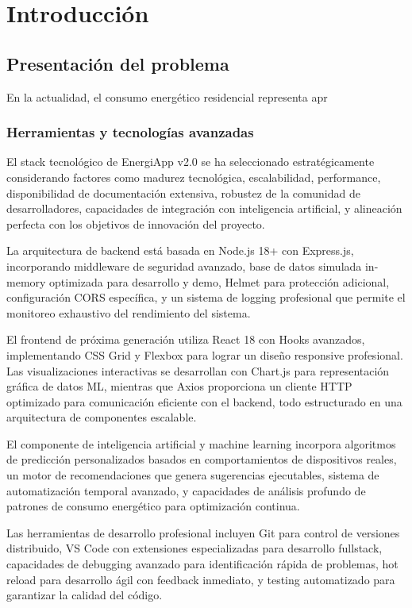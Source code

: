 \chapter{Introducción}
\label{ch:introduccion}

\section{Presentación del problema}

En la actualidad, el consumo energético residencial representa apr\subsection{Herramientas y tecnologías avanzadas}

El stack tecnológico de EnergiApp v2.0 se ha seleccionado estratégicamente considerando factores como madurez tecnológica, escalabilidad, performance, disponibilidad de documentación extensiva, robustez de la comunidad de desarrolladores, capacidades de integración con inteligencia artificial, y alineación perfecta con los objetivos de innovación del proyecto.

La arquitectura de backend está basada en Node.js 18+ con Express.js, incorporando middleware de seguridad avanzado, base de datos simulada in-memory optimizada para desarrollo y demo, Helmet para protección adicional, configuración CORS específica, y un sistema de logging profesional que permite el monitoreo exhaustivo del rendimiento del sistema.

El frontend de próxima generación utiliza React 18 con Hooks avanzados, implementando CSS Grid y Flexbox para lograr un diseño responsive profesional. Las visualizaciones interactivas se desarrollan con Chart.js para representación gráfica de datos ML, mientras que Axios proporciona un cliente HTTP optimizado para comunicación eficiente con el backend, todo estructurado en una arquitectura de componentes escalable.

El componente de inteligencia artificial y machine learning incorpora algoritmos de predicción personalizados basados en comportamientos de dispositivos reales, un motor de recomendaciones que genera sugerencias ejecutables, sistema de automatización temporal avanzado, y capacidades de análisis profundo de patrones de consumo energético para optimización continua.

Las herramientas de desarrollo profesional incluyen Git para control de versiones distribuido, VS Code con extensiones especializadas para desarrollo fullstack, capacidades de debugging avanzado para identificación rápida de problemas, hot reload para desarrollo ágil con feedback inmediato, y testing automatizado para garantizar la calidad del código.

